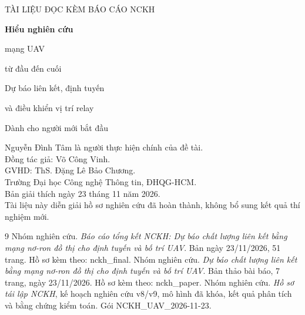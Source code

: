 \documentclass[12pt,a4paper,oneside]{report}
\begin{document}
\hypersetup{pageanchor=false}
\begin{titlepage}
\sffamily\color{inkblue}\vspace*{20mm}
{\Large TÀI LIỆU ĐỌC KÈM BÁO CÁO NCKH\par}\vspace{16mm}
{\Huge\bfseries Hiểu nghiên cứu\par mạng UAV\par từ đầu đến cuối\par}\vspace{12mm}
{\Large Dự báo liên kết, định tuyến\par và điều khiển vị trí relay\par}
\vspace{18mm}\color{black}
{\large Dành cho người mới bắt đầu\par}
\vfill
Nguyễn Đình Tâm là người thực hiện chính của đề tài.\\
Đồng tác giả: Võ Công Vinh.\\
GVHD: ThS. Đặng Lê Bảo Chương.\\
Trường Đại học Công nghệ Thông tin, ĐHQG-HCM.\\[6mm]
Bản giải thích ngày 23 tháng 11 năm 2026.\\
Tài liệu này diễn giải hồ sơ nghiên cứu đã hoàn thành, không bổ sung kết quả thí nghiệm mới.
\end{titlepage}
\hypersetup{pageanchor=true}
\tableofcontents
\clearpage
{}








\begin{thebibliography}{9}
 Nhóm nghiên cứu. \emph{Báo cáo tổng kết NCKH: Dự báo chất lượng liên kết bằng mạng nơ-ron đồ thị cho định tuyến và bố trí UAV}. Bản ngày 23/11/2026, 51 trang. Hồ sơ kèm theo: nckh\_final.
 Nhóm nghiên cứu. \emph{Dự báo chất lượng liên kết bằng mạng nơ-ron đồ thị cho định tuyến và bố trí UAV}. Bản thảo bài báo, 7 trang, ngày 23/11/2026. Hồ sơ kèm theo: nckh\_paper.
 Nhóm nghiên cứu. \emph{Hồ sơ tái lập NCKH}, kế hoạch nghiên cứu v8/v9, mô hình đã khóa, kết quả phân tích và bằng chứng kiểm toán. Gói NCKH\_UAV\_2026-11-23.
\end{thebibliography}
\end{document}
